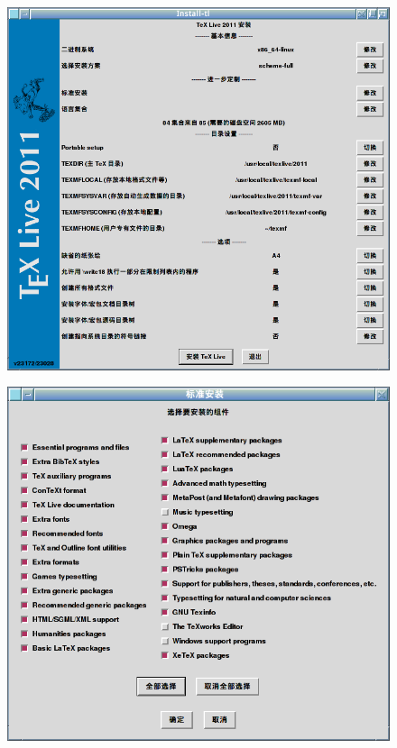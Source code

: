 \documentclass{beamer}
\begin{document}
\begin{frame}
  \begin{figure}[h]
  \centering
\includegraphics[scale=0.35]{main-init.png}
  \end{figure}
\end{frame}

\begin{frame}
  \begin{figure}[h]
  \centering
\includegraphics[scale=0.4]{标准安装.png}
  \end{figure}
\end{frame}
\end{document}
